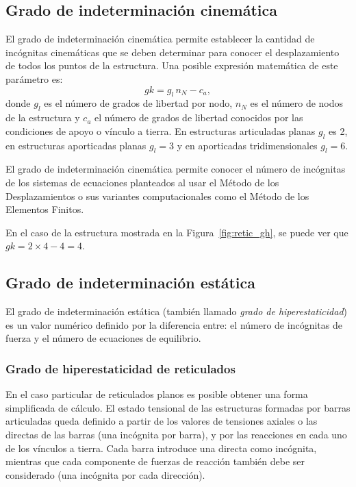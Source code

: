 \subsection{Grado de indeterminación cinemática}\label{sec:gk}

El grado de indeterminación cinemática permite establecer la cantidad de incógnitas cinemáticas que se deben determinar para conocer el desplazamiento de todos los puntos de la estructura.
%
Una posible expresión matemática de este parámetro es:
%
\begin{equation}
	gk = g_l \, n_N - c_a,
\end{equation}
%
donde $g_l$ es el número de grados de libertad por nodo, $n_N$ es el número de nodos de la estructura y $c_a$ el número de grados de libertad conocidos por las condiciones de apoyo o vínculo a tierra. %
%
En estructuras articuladas planas $g_l$ es 2, en estructuras aporticadas planas $g_l=3$ y en aporticadas tridimensionales $g_l=6$.

El grado de indeterminación cinemática permite conocer el número de incógnitas de los sistemas de ecuaciones planteados al usar el Método de los Desplazamientos o sus variantes computacionales como el Método de los Elementos Finitos.

En el caso de la estructura mostrada en la Figura~\ref{fig:retic_gh}, se puede ver que $gk=2\times 4 - 4=4$.


\subsection{Grado de indeterminación estática}\label{sec:gh}

El grado de indeterminación estática (también llamado \textit{grado de hiperestaticidad}) es un valor numérico definido por la diferencia entre: el número de incógnitas de fuerza y el número de ecuaciones de equilibrio. %
%

\subsubsection{Grado de hiperestaticidad de reticulados}

En el caso particular de reticulados planos es posible obtener una forma simplificada de cálculo. %
% 
El estado tensional de las estructuras formadas por barras articuladas queda definido a partir de los valores de tensiones axiales o las directas de las barras (una incógnita por barra), y por las reacciones en cada uno de los vínculos a tierra. %
%
Cada barra introduce una directa como incógnita, mientras que cada componente de fuerzas de reacción también debe ser considerado (una incógnita por cada dirección).

